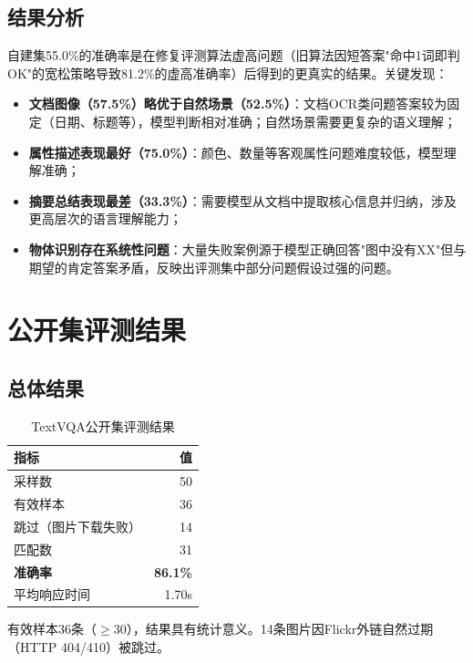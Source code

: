 \subsection{结果分析}

自建集55.0\%的准确率是在修复评测算法虚高问题（旧算法因短答案"命中1词即判OK"的宽松策略导致81.2\%的虚高准确率）后得到的更真实的结果。关键发现：

\begin{itemize}
  \item \textbf{文档图像（57.5\%）略优于自然场景（52.5\%）}：文档OCR类问题答案较为固定（日期、标题等），模型判断相对准确；自然场景需要更复杂的语义理解；
  \item \textbf{属性描述表现最好（75.0\%）}：颜色、数量等客观属性问题难度较低，模型理解准确；
  \item \textbf{摘要总结表现最差（33.3\%）}：需要模型从文档中提取核心信息并归纳，涉及更高层次的语言理解能力；
  \item \textbf{物体识别存在系统性问题}：大量失败案例源于模型正确回答"图中没有XX"但与期望的肯定答案矛盾，反映出评测集中部分问题假设过强的问题。
\end{itemize}

\section{公开集评测结果}

\subsection{总体结果}

\begin{table}[htbp]
  \centering
  \caption{TextVQA公开集评测结果}
  \label{tab:public_overall}
  \begin{tabular}{|l|r|}
    \hline
    \textbf{指标} & \textbf{值} \\
    \hline
    采样数 & 50 \\
    有效样本 & 36 \\
    跳过（图片下载失败） & 14 \\
    匹配数 & 31 \\
    \textbf{准确率} & \textbf{86.1\%} \\
    平均响应时间 & 1.70s \\
    \hline
  \end{tabular}
\end{table}

有效样本36条（$\geq$30），结果具有统计意义。14条图片因Flickr外链自然过期（HTTP 404/410）被跳过。

